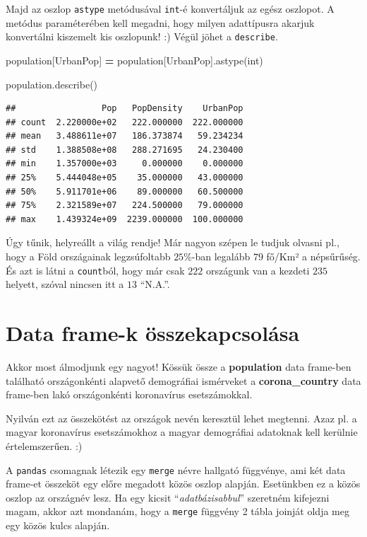 \documentclass[
]{book}
\newenvironment{Shaded}{\begin{snugshade}}{\end{snugshade}}
\newcommand{\BuiltInTok}[1]{#1}
\newcommand{\NormalTok}[1]{#1}
\newcommand{\OperatorTok}[1]{\textcolor[rgb]{0.81,0.36,0.00}{\textbf{#1}}}
\newcommand{\StringTok}[1]{\textcolor[rgb]{0.31,0.60,0.02}{#1}}
\begin{document}
Majd az oszlop \texttt{astype} metódusával \texttt{int}-é konvertáljuk az egész oszlopot. A metódus paraméterében kell megadni, hogy milyen adattípusra akarjuk konvertálni kiszemelt kis oszlopunk! :) Végül jöhet a \texttt{describe}.

\begin{Shaded}
\begin{Highlighting}[]
\NormalTok{population[}\StringTok{\textquotesingle{}UrbanPop\textquotesingle{}}\NormalTok{] }\OperatorTok{=}\NormalTok{ population[}\StringTok{\textquotesingle{}UrbanPop\textquotesingle{}}\NormalTok{].astype(}\BuiltInTok{int}\NormalTok{)}

\NormalTok{population.describe()}
\end{Highlighting}
\end{Shaded}

\begin{verbatim}
##                 Pop   PopDensity    UrbanPop
## count  2.220000e+02   222.000000  222.000000
## mean   3.488611e+07   186.373874   59.234234
## std    1.388508e+08   288.271695   24.230400
## min    1.357000e+03     0.000000    0.000000
## 25%    5.444048e+05    35.000000   43.000000
## 50%    5.911701e+06    89.000000   60.500000
## 75%    2.321589e+07   224.500000   79.000000
## max    1.439324e+09  2239.000000  100.000000
\end{verbatim}

Úgy tűnik, helyreállt a világ rendje! Már nagyon szépen le tudjuk olvasni pl., hogy a Föld országainak legzsúfoltabb \(25\%\)-ban legalább \(79\) fő/Km² a népsűrűség. És azt is látni a \texttt{count}ból, hogy már csak \(222\) országunk van a kezdeti \(235\) helyett, szóval nincsen itt a \(13\) ``N.A.''.

\section{Data frame-k összekapcsolása}\label{data-frame-k-uxf6sszekapcsoluxe1sa}

Akkor most álmodjunk egy nagyot! Kössük össze a \textbf{population} data frame-ben található országonkénti alapvető demográfiai ismérveket a \textbf{corona\_country} data frame-ben lakó országonkénti koronavírus esetszámokkal.

Nyilván ezt az összekötést az országok nevén keresztül lehet megtenni. Azaz pl. a magyar koronavírus esetszámokhoz a magyar demográfiai adatoknak kell kerülnie értelemszerűen. :)

A \texttt{pandas} csomagnak létezik egy \texttt{merge} névre hallgató függvénye, ami két data frame-et összeköt egy előre megadott közös oszlop alapján. Esetünkben ez a közös oszlop az országnév lesz.
Ha egy kicsit ``\emph{adatbázisabbul}'' szeretném kifejezni magam, akkor azt mondanám, hogy a \texttt{merge} függvény 2 tábla joinját oldja meg egy közös kulcs alapján.
\end{document}
